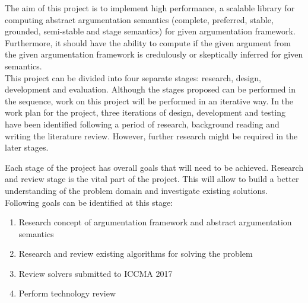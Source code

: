 The aim of this project is to implement high performance, a scalable library for computing abstract argumentation semantics (complete, preferred, stable, grounded, semi-stable and stage semantics) for given argumentation framework. Furthermore, it should have the ability to compute if the given argument from the given argumentation framework is credulously or skeptically inferred for given semantics.\\
This project can be divided into four separate stages: research, design, development and evaluation. Although the stages proposed can be performed in the sequence, work on this project will be performed in an iterative way. In the work plan for the project, three iterations of design, development and testing have been identified following a period of research, background reading and writing the literature review. However, further research might be required in the later stages.

Each stage of the project has overall goals that will need to be achieved. Research and review stage is the vital part of the project. This will allow to build a better understanding of the problem domain and investigate existing solutions. Following goals can be identified at this stage:
\begin{enumerate}
	\item{Research concept of argumentation framework and abstract argumentation semantics}
	\item{Research and review existing algorithms for solving the problem}
	\item{Review solvers submitted to ICCMA 2017}
	\item{Perform technology review}
\end{enumerate}

